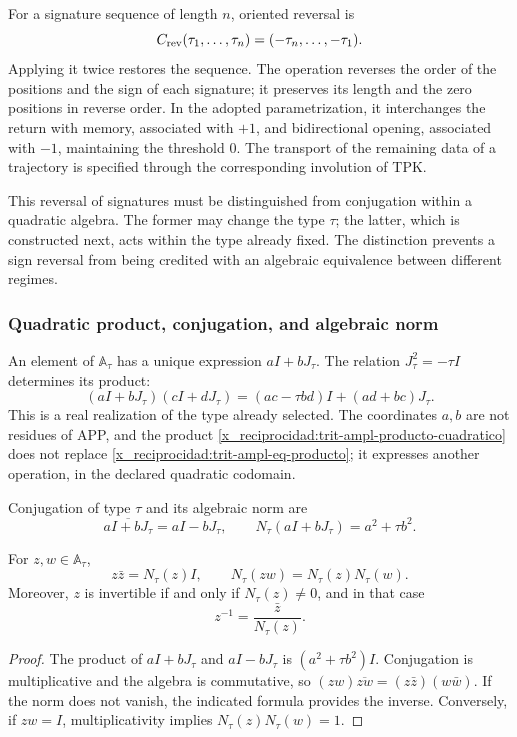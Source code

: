 For a signature sequence of length \(n\), oriented reversal is
\[
 C_{\rm rev}(\tau_1,\ldots,\tau_n)
   =(-\tau_n,\ldots,-\tau_1).
\]
Applying it twice restores the sequence. The operation reverses the order of
the positions and the sign of each signature; it preserves its length and the
zero positions in reverse order. In the adopted parametrization,
it interchanges the return with memory, associated with \(+1\), and bidirectional
opening, associated with \(-1\), maintaining the threshold \(0\). The transport
of the remaining data of a trajectory is specified through the
corresponding involution of TPK.

This reversal of signatures must be distinguished from conjugation within a
quadratic algebra. The former may change the type \(\tau\); the latter,
which is constructed next, acts within the type already fixed. The
distinction prevents a sign reversal from being credited with an algebraic
equivalence between different regimes.

\subsubsection{Quadratic product, conjugation, and algebraic norm}
\label{x_reciprocidad:trit-ampl-norma}

An element of \(\mathbb A_\tau\) has a unique expression \(aI+bJ_\tau\).
The relation \(J_\tau^2=-\tau I\) determines its product:
\begin{equation}
 (aI+bJ_\tau)(cI+dJ_\tau)
   =(ac-\tau bd)I+(ad+bc)J_\tau.
 \label{x_reciprocidad:trit-ampl-producto-cuadratico}
\end{equation}
This is a real realization of the type already selected. The coordinates
\(a,b\) are not residues of APP, and the product
\eqref{x_reciprocidad:trit-ampl-producto-cuadratico} does not replace
\eqref{x_reciprocidad:trit-ampl-eq-producto}; it expresses another operation, in the declared
quadratic codomain.

\begin{definition}
\label{x_reciprocidad:trit-ampl-def-norma}
Conjugation of type \(\tau\) and its algebraic norm are
\[
 \overline{aI+bJ_\tau}=aI-bJ_\tau,\qquad
 N_\tau(aI+bJ_\tau)=a^2+\tau b^2.
\]
\end{definition}

\begin{proposition}
\label{x_reciprocidad:trit-ampl-prop-norma}
For \(z,w\in\mathbb A_\tau\),
\[
 z\bar z=N_\tau(z)I,\qquad
 N_\tau(zw)=N_\tau(z)N_\tau(w).
\]
Moreover, \(z\) is invertible if and only if \(N_\tau(z)\ne0\), and in that case
\[
 z^{-1}=\frac{\bar z}{N_\tau(z)}.
\]
\end{proposition}
\begin{proof}
The product of \(aI+bJ_\tau\) and \(aI-bJ_\tau\) is
\((a^2+\tau b^2)I\). Conjugation is multiplicative and the algebra is
commutative, so
\((zw)\overline{zw}=(z\bar z)(w\bar w)\). If the norm does not vanish, the
indicated formula provides the inverse. Conversely, if \(zw=I\),
multiplicativity implies \(N_\tau(z)N_\tau(w)=1\).
\end{proof}

